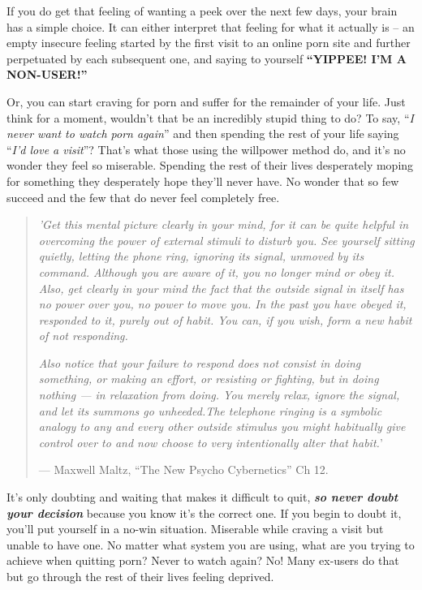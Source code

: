 \documentclass[
]{book}
\begin{document}
If you do get that feeling of wanting a peek over the next few days, your brain has a simple choice. It can either interpret that feeling for what it actually is -- an empty insecure feeling started by the first visit to an online porn site and further perpetuated by each subsequent one, and saying to yourself \textbf{``YIPPEE! I'M A NON-USER!''}

Or, you can start craving for porn and suffer for the remainder of your life. Just think for a moment, wouldn't that be an incredibly stupid thing to do? To say, ``\emph{I never want to watch porn again}'' and then spending the rest of your life saying ``\emph{I'd love a visit}''? That's what those using the willpower method do, and it's no wonder they feel so miserable. Spending the rest of their lives desperately moping for something they desperately hope they'll never have. No wonder that so few succeed and the few that do never feel completely free.

\begin{quote}
\emph{'Get this mental picture clearly in your mind, for it can be quite helpful in overcoming the power of external stimuli to disturb you. See yourself sitting quietly, letting the phone ring, ignoring its signal, unmoved by its command. Although you are aware of it, you no longer mind or obey it. Also, get clearly in your mind the fact that the outside signal in itself has no power over you, no power to move you. In the past you have obeyed it, responded to it, purely out of habit. You can, if you wish, form a new habit of not responding.}

\emph{Also notice that your failure to respond does not consist in doing something, or making an effort, or resisting or fighting, but in doing nothing --- in relaxation from doing. You merely relax, ignore the signal, and let its summons go unheeded.The telephone ringing is a symbolic analogy to any and every other outside stimulus you might habitually give control over to and now choose to very intentionally alter that habit.}'

--- Maxwell Maltz, ``The New Psycho Cybernetics'' Ch 12.
\end{quote}

It's only doubting and waiting that makes it difficult to quit, \textbf{\emph{so never doubt your decision}} because you know it's the correct one. If you begin to doubt it, you'll put yourself in a no-win situation. Miserable while craving a visit but unable to have one. No matter what system you are using, what are you trying to achieve when quitting porn? Never to watch again? No! Many ex-users do that but go through the rest of their lives feeling deprived.
\end{document}
